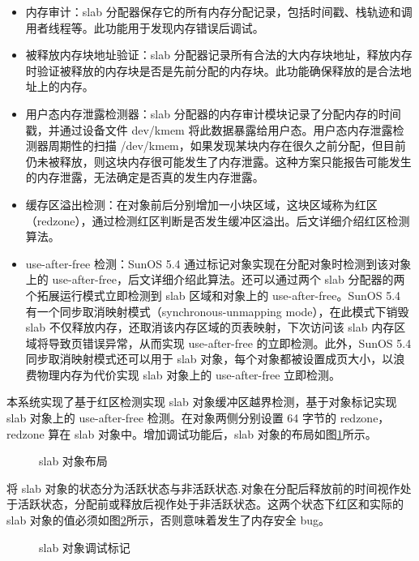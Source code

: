 \documentclass[AutoFakeBold]{LZUThesis}
\begin{document}
\begin{sloppypar}
\begin{itemize}
\item
  内存审计：slab
  分配器保存它的所有内存分配记录，包括时间戳、栈轨迹和调用者线程等。此功能用于发现内存错误后调试。
\item
  被释放内存块地址验证：slab 分配器记录所有合法的大内存块地址，释放内存时验证被释放的内存块是否是先前分配的内存块。此功能确保释放的是合法地址上的内存。
\item
  用户态内存泄露检测器：slab
  分配器的内存审计模块记录了分配内存的时间戳，并通过设备文件 dev/kmem
  将此数据暴露给用户态。用户态内存泄露检测器周期性的扫描
  /dev/kmem，如果发现某块内存在很久之前分配，但目前仍未被释放，则这块内存很可能发生了内存泄露。这种方案只能报告可能发生的内存泄露，无法确定是否真的发生内存泄露。
\item
  缓存区溢出检测：在对象前后分别增加一小块区域，这块区域称为红区（redzone），通过检测红区判断是否发生缓冲区溢出。后文详细介绍红区检测算法。
\item
  use-after-free 检测：SunOS 5.4
  通过标记对象实现在分配对象时检测到该对象上的
  use-after-free，后文详细介绍此算法。还可以通过两个 slab
  分配器的两个拓展运行模式立即检测到 slab 区域和对象上的
  use-after-free。SunOS 5.4
  有一个同步取消映射模式（synchronous-unmapping mode），在此模式下销毁 slab
  不仅释放内存，还取消该内存区域的页表映射，下次访问该 slab
  内存区域将导致页错误异常，从而实现 use-after-free
  的立即检测。此外，SunOS 5.4 同步取消映射模式还可以用于 slab 对象，每个对象都被设置成页大小，以浪费物理内存为代价实现 slab 对象上的 use-after-free 立即检测。
\end{itemize}

本系统实现了基于红区检测实现 slab 对象缓冲区越界检测，基于对象标记实现 slab 对象上的 use-after-free 检测。在对象两侧分别设置 64 字节的 redzone，redzone 算在 slab 对象中。增加调试功能后，slab 对象的布局如图\ref{figure:slab-debug-layout}所示。

\begin{figure}[H]
\centering

\caption{slab 对象布局}
\label{figure:slab-debug-layout}
\end{figure}

将 slab
对象的状态分为活跃状态与非活跃状态.对象在分配后释放前的时间视作处于活跃状态，分配前或释放后视作处于非活跃状态。这两个状态下红区和实际的
slab 对象的值必须如图\ref{figure:slab-obj-debug-mark}所示，否则意味着发生了内存安全 bug。

\begin{figure}[H]
\centering

\caption{slab 对象调试标记}
\label{figure:slab-obj-debug-mark}
\end{figure}


\end{sloppypar}
\end{document}

